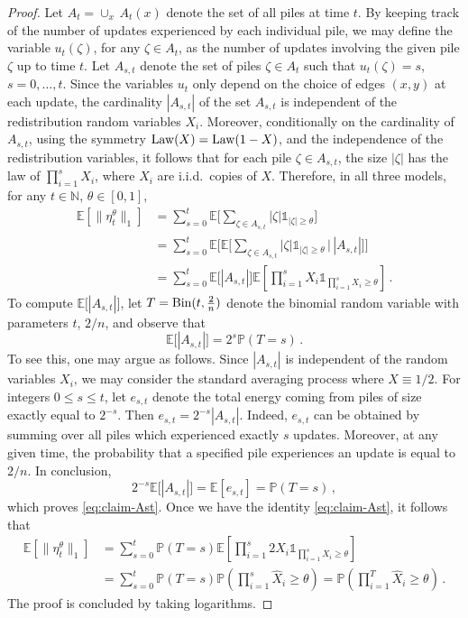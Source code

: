 \documentclass[11pt,reqno]{amsart}
\theoremstyle{remark}
\theoremstyle{definition}
\numberwithin{equation}{section}
\numberwithin{figure}{section}
\newcommand{\E}{\mathds{E}}
\renewcommand{\P}{\mathds{P}}
\newcommand{\N}{\mathbb{N}}
\newcommand{\car}{\mathds{1}}
\begin{document}
\begin{proof}	
	Let $A_t=\cup_x\, A_t(x)$ denote the set of all piles at time $t$. By keeping track of the number of updates experienced by each individual pile, we may define the variable $u_t(\zeta)$, for any $\zeta\in A_t$, as the number of updates involving the given pile $\zeta$ up to time $t$.  Let $A_{s,t}$ denote the set of piles $\zeta\in A_t$ such that $u_t(\zeta)=s$, $s=0,\dots,t$. Since the variables $u_t$ only depend on the choice of edges $(x,y)$ at each update, the cardinality $|A_{s,t}|$ of the set $A_{s,t}$ is independent of the redistribution random variables $X_i$. Moreover, conditionally on the cardinality of $A_{s,t}$, using the symmetry ${\rm Law}(X)={\rm Law}(1-X)$, and the independence of the redistribution variables, it follows that for each pile  $\zeta\in A_{s,t}$, the size $|\zeta|$ has the law of $ \prod_{i=1}^{s}X_i$, where $X_i$ are i.i.d.\ copies of $X$. 
		Therefore, in all three models, for any $t\in\N$, $\theta\in [0,1]$, 
		\begin{align*}
			\E\left[\|\eta^\theta_t\|_1\right]&= \sum_{s=0}^t\E\bigg[\textstyle{\sum_{\zeta\in A_{s,t}}} |\zeta|\car_{|\zeta|\ge\theta}  \bigg]\\
			&=\sum_{s=0}^t\E\bigg[\E\bigg[\textstyle{\sum_{\zeta\in A_{s,t}}} |\zeta|\car_{|\zeta|\ge\theta} \,\Big\rvert\, |A_{s,t}|\bigg] \bigg]\\
			&=\sum_{s=0}^t\E\big[| A_{s,t} |\big] \E\left[\textstyle{\prod_{i=1}^{s}}X_i\car_{\prod_{i=1}^{s}X_i\ge\theta}\right] \,.
		\end{align*}
	To compute $\E\big[| A_{s,t} |\big]$, let $T={\rm Bin}(t,\tfrac2n)$ denote the binomial random variable with parameters $t$, $2/n$, and observe that 
		\begin{equation}\label{eq:claim-Ast}
			\E\big[| A_{s,t} |\big]=2^s\P\left(T=s\right)\,.
		\end{equation}
		To see this, one may argue as follows. Since $|A_{s,t}|$ is independent of the random variables $X_i$, we may consider the standard averaging process where $X\equiv1/2$. For integers $0\le s\le t$, let $e_{s,t}$ denote the total energy coming from piles of size exactly equal to $2^{-s}$. Then $e_{s,t}=2^{-s}|A_{s,t}|$.  Indeed, $e_{s,t}$ can be obtained by summing over all piles which experienced exactly $s$ updates. Moreover, at any given time, the probability that a specified pile experiences an update is equal to $2/n$.  In conclusion, 
		\begin{equation}
			2^{-s}\E\big[| A_{s,t} |\big]=\E[e_{s,t}]=\P(T=s)\,, 
		\end{equation}
		which proves \eqref{eq:claim-Ast}.
				Once we have the identity \eqref{eq:claim-Ast}, it follows that 
			\begin{align*}
			\E\left[\|\eta_t^\theta\|_1\right ]
			&=\sum_{s=0}^t \P\left(T=s\right) \E\left[\textstyle{\prod_{i=1}^{s}}2X_i\car_{\prod_{i=1}^{s}X_i\ge\theta}\right] \\
&=\sum_{s=0}^t \P\left(T=s\right)\P\left(\textstyle{\prod_{i=1}^{s}} \hat X_i\ge\theta\right)=\P\left(\textstyle{\prod_{i=1}^{T}}\hat X_i\ge \theta\right)\,.
		\end{align*}
		The proof is concluded by taking logarithms.
	\end{proof}
\end{document}
